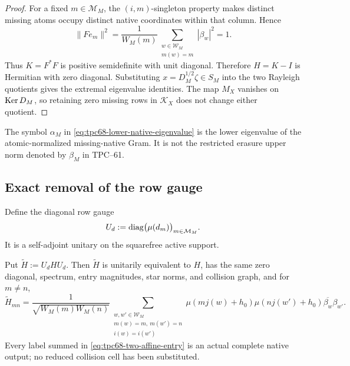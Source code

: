 \begin{proof}
For a fixed \(m\in\mathcal M_M\), the \((i,m)\)-singleton property makes distinct missing
atoms occupy distinct native coordinates within that column.  Hence
\[
 \|Fe_m\|^2
 =\frac1{W_M(m)}
   \sum_{\substack{w\in\mathcal W_M\\m(w)=m}}|\beta_w|^2
 =1.
\]
Thus \(K=F^*F\) is positive semidefinite with unit diagonal.  Therefore
\(H=K-I\) is Hermitian with zero diagonal.  Substituting
\(x=D_M^{1/2}\zeta\in S_M\) into the two Rayleigh quotients gives the
extremal eigenvalue identities.  The map \(M_X\) vanishes on
\(\operatorname{Ker} D_M\), so retaining zero missing rows in \(\mathcal K_X\) does not
change either quotient.
\end{proof}

\begin{remark}[Notation]
The symbol \(\alpha_M\) in
\eqref{eq:tpc68-lower-native-eigenvalue} is the lower eigenvalue of the
atomic-normalized missing-native Gram.  It is not the restricted erasure
upper norm denoted by \(\beta_M\) in TPC--61.
\end{remark}

\subsection{Exact removal of the row gauge}

Define the diagonal row gauge
\begin{equation}
 U_d:=\operatorname{diag}\bigl(\mu(d_m)\bigr)_{m\in\mathcal M_M}.
 \label{eq:tpc68-row-gauge}
\end{equation}
It is a self-adjoint unitary on the squarefree active support.

\begin{theorem}
\label{thm:tpc68-gauge-to-sign}
Put \(\widetilde H:=U_dHU_d\).  Then \(\widetilde H\) is unitarily
equivalent to \(H\), has the same zero diagonal, spectrum, entry
magnitudes, star norms, and collision graph, and for \(m\ne n\),
\begin{equation}
 \boxed{
 \widetilde H_{mn}
 =
 \frac1{\sqrt{W_M(m)W_M(n)}}
 \sum_{\substack{w,w'\in\mathcal W_M\\
                 m(w)=m,\ m(w')=n\\
                 i(w)=i(w')}}
 \mu(mj(w)+h_0)\mu(nj(w')+h_0)
 \overline{\beta_w}\beta_{w'}.}
 \label{eq:tpc68-two-affine-entry}
\end{equation}
Every label summed in \eqref{eq:tpc68-two-affine-entry} is an actual
complete native output; no reduced collision cell has been substituted.
\end{theorem}

